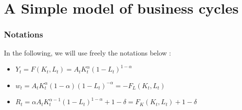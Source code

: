 \documentclass[12pt]{article}
\begin{document}
\section{A Simple model of business cycles}
\subsubsection*{Notations}
In the following, we will use freely the notations below :
\begin{itemize}
    \item $Y_t = F(K_t, L_t) = A_t K_t^{\alpha}(1 - L_t)^{1 - \alpha}$
    \item $w_t = A_t K_t^{\alpha} (1 - \alpha)(1 - L_t)^{-\alpha} = - F_L(K_t,L_t)$
    \item $R_t = \alpha A_t K_t^{\alpha -1 } (1 - L_t)^{1 - \alpha} + 1 - \delta = F_K(K_t, L_t) + 1 - \delta$
\end{itemize}
\end{document}
